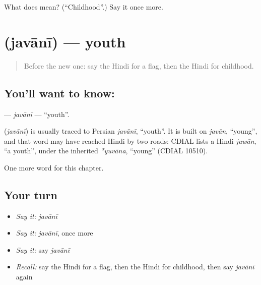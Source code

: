 \begin{tcolorbox}[breakable,colback=teal!4,colframe=teal!35!black,title={Before you move on}]
What does  mean? (\textquotedblleft{}Childhood\textquotedblright{}.) Say it once more.
\end{tcolorbox}
\section[\texorpdfstring{\hi{जवानी} (javānī)}{जवानी (javānī)}]{ (javānī) — youth}

\label{lesson:HI-C220-javani}



\begin{quote}
Before the new one: say the Hindi for a flag, then the Hindi for childhood.
\end{quote}

\subsection*{You'll want to know: }
\textbf{} — \emph{javānī} — \textquotedblleft{}youth\textquotedblright{}.

\begin{cousinweb}
\textbf{} (\emph{javānī}) is usually traced to Persian \emph{javānī}, \textquotedblleft{}youth\textquotedblright{}. It is built on \emph{javān}, \textquotedblleft{}young\textquotedblright{}, and that word may have reached Hindi by two roads: CDIAL lists a Hindi \emph{juwān}, \textquotedblleft{}a youth\textquotedblright{}, under the inherited \emph{*yuvāna}, \textquotedblleft{}young\textquotedblright{} (CDIAL 10510).
\end{cousinweb}

\begin{grammarlens}[title={What you've built}]
One more word for this chapter.
\end{grammarlens}

\subsection*{Your turn}
\begin{itemize}
\raggedright
  \item \emph{Say it:} \emph{javānī}
  \item \emph{Say it:} \emph{javānī}, once more
  \item \emph{Say it:} say \emph{javānī}
  \item \emph{Recall:} say the Hindi for a flag, then the Hindi for childhood, then say \emph{javānī} again
\end{itemize}

